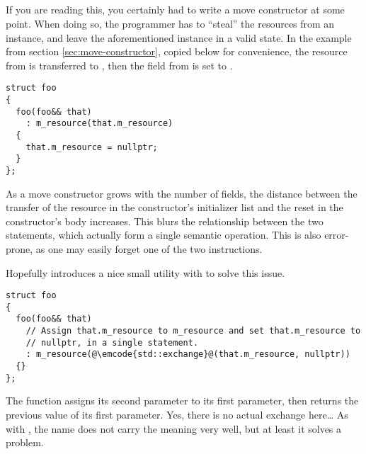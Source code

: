 \subsection{}%
%
%
%
If you are reading this, you certainly had to write a move constructor
at some point. When doing so, the programmer has to ``steal'' the
resources from an instance, and leave the aforementioned instance in a
valid state. In the example from section \ref{sec:move-constructor},
copied below for convenience, the resource from  is
transferred to , then the field from  is set to
.

\begin{lstlisting}
struct foo
{
  foo(foo&& that)
    : m_resource(that.m_resource)
  {
    that.m_resource = nullptr;
  }
};
\end{lstlisting}

As a move constructor grows with the number of fields, the distance
between the transfer of the resource in the constructor's initializer
list and the reset in the constructor's body increases. This blurs the
relationship between the two statements, which actually form a single
semantic operation. This is also error-prone, as one may easily forget
one of the two instructions.

\bigskip

Hopefully  introduces a nice small utility with
 to solve this issue.

\begin{lstlisting}
struct foo
{
  foo(foo&& that)
    // Assign that.m_resource to m_resource and set that.m_resource to
    // nullptr, in a single statement.
    : m_resource(@\emcode{std::exchange}@(that.m_resource, nullptr))
  {}
};
\end{lstlisting}

The  function assigns its second parameter to its
first parameter, then returns the previous value of its first
parameter. Yes, there is no actual exchange here… As with
, the name does not carry the meaning very well, but
at least it solves a problem.

